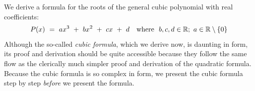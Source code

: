   

We derive a formula for the roots of the general cubic polynomial  with real coefficients:
\begin{equation}
\label{eq:generic-cubic-1}
P(x) \ = \  ax^3 \ + \ bx^2 \ + \ cx \ + \ d \ \ \mbox{  where  }
\ b,c, d  \in \mathbb{R};\ a \in \mathbb{R} \setminus \{0\}
\end{equation}
Although the so-called {\em cubic formula}, which we derive now, is daunting in form, its proof and derivation should be quite accessible because they follow the same flow as the clerically much simpler proof and derivation of the quadratic formula.  Because the cubic formula is so complex in form, we present the cubic formula step by step {\em before} we present the formula.

